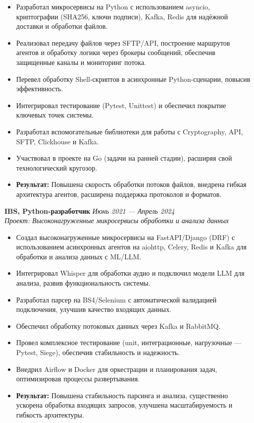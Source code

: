 \documentclass[11pt]{article}
\begin{document}
\begin{itemize}
    \vspace{-6pt}\item Разработал микросервисы на Python с использованием asyncio, криптографии (SHA256, ключи подписи), Kafka, Redis для надёжной доставки и обработки файлов.
    \item Реализовал передачу файлов через SFTP/API, построение маршрутов агентов и обработку логики через брокеры сообщений, обеспечив защищенные каналы и мониторинг потока.
    \item Перевел обработку Shell-скриптов в асинхронные Python-сценарии, повысив эффективность.
    \item Интегрировал тестирование (Pytest, Unittest) и обеспечил покрытие ключевых точек системы.
    \item Разработал вспомогательные библиотеки для работы с Cryptography, API, SFTP, Clickhouse и Kafka.
    \item Участвовал в проекте на Go (задачи на ранней стадии), расширяя свой технологический кругозор.
    \item \textbf{Результат:} Повышена скорость обработки потоков файлов, внедрена гибкая архитектура агентов, расширена поддержка протоколов и форматов.
\end{itemize}
\vspace{8pt}
\textbf{IBS, Python-разработчик} \hfill \textit{Июнь 2021 — Апрель 2024} \\
\textit{Проект: Высоконагруженные микросервисы обработки и анализа данных}
\begin{itemize}
    \vspace{-6pt}\item Создал высоконагруженные микросервисы на FastAPI/Django (DRF) с использованием асинхронных агентов на aiohttp, Celery, Redis и Kafka для обработки и анализа данных с ML/LLM.
    \item Интегрировал Whisper для обработки аудио и подключил модели LLM для анализа, развив функциональность системы.
    \item Разработал парсер на BS4/Selenium с автоматической валидацией подключения, улучшив качество входящих данных.
     \item Обеспечил обработку потоковых данных через Kafka и RabbitMQ.
    \item Провел комплексное тестирование (unit, интеграционные, нагрузочные — Pytest, Siege), обеспечив стабильность и надежность.
    \item Внедрил Airflow и Docker для оркестрации и планирования задач, оптимизировав процессы развертывания.
    \item \textbf{Результат:} Повышена стабильность парсинга и анализа, существенно ускорена обработка входящих запросов, улучшена масштабируемость и гибкость архитектуры.
\end{itemize}
\end{document}
